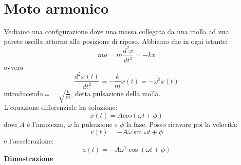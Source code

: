 \documentclass[a4paper,12pt]{article}
\begin{document}
\section{Moto armonico}
Vediamo una configurazione dove una massa collegata da una molla ad una parete oscilla attorno alla posizione di riposo.
Abbiamo che in ogni istante:
$$ ma = m \frac{d^2x}{dt^2} = -kx $$
ovvero
$$ \frac{d^2x(t)}{dt^2} = -\frac{k}{m}x(t) = -\omega^2x(t)$$
introducendo $ \omega = \sqrt{\frac{k}{m}}$, detta pulsazione della molla. \\
L'equazione differenziale ha soluzione:
$$ x(t) = Acos(\omega t + \phi) $$
dove $A$ è l'ampiezza, $\omega$ la pulsazione e $\phi$ la fase.
Posso ricavare poi la velocità:
$$ v(t) = -A\omega\sin{\omega t + \phi} $$
e l'accelerazione:
$$ a(t) = -A\omega^2\cos(\omega t + \phi) $$
\newpage
\textbf{Dimostrazione} \\
\end{document}
